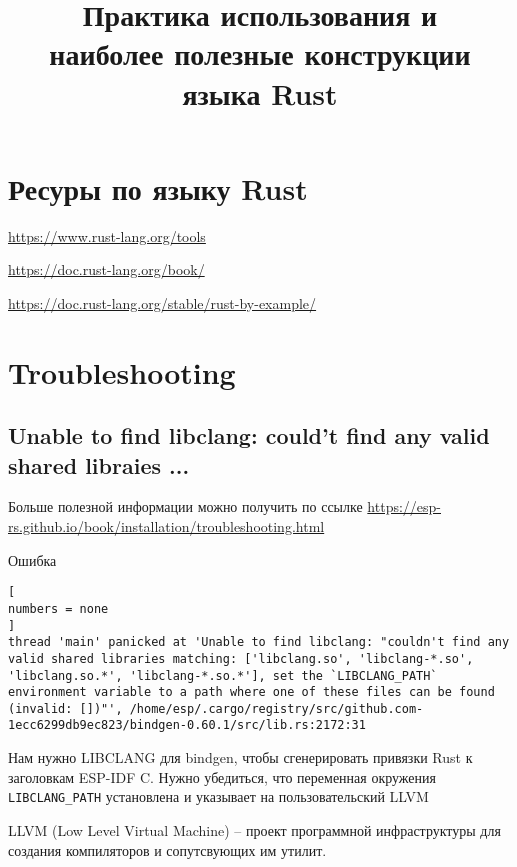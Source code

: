 \documentclass[%
	11pt,
	a4paper,
	utf8,
		]{article}
\begin{document}
\title{Практика использования и \\наиболее полезные конструкции языка Rust}

\author{}

\date{}
\maketitle

\thispagestyle{fancy}

\tableofcontents

\section{Ресуры по языку Rust}

\url{https://www.rust-lang.org/tools}

\url{https://doc.rust-lang.org/book/}

\url{https://doc.rust-lang.org/stable/rust-by-example/}

\section{Troubleshooting}

\subsection{Unable to find libclang: could't find any valid shared libraies ...}

Больше полезной информации можно получить по ссылке \url{https://esp-rs.github.io/book/installation/troubleshooting.html}

Ошибка
\begin{lstlisting}[
numbers = none	
]
thread 'main' panicked at 'Unable to find libclang: "couldn't find any valid shared libraries matching: ['libclang.so', 'libclang-*.so', 'libclang.so.*', 'libclang-*.so.*'], set the `LIBCLANG_PATH` environment variable to a path where one of these files can be found (invalid: [])"', /home/esp/.cargo/registry/src/github.com-1ecc6299db9ec823/bindgen-0.60.1/src/lib.rs:2172:31
\end{lstlisting}

Нам нужно LIBCLANG для bindgen, чтобы сгенерировать привязки Rust к заголовкам ESP-IDF C. Нужно убедиться, что переменная окружения \verb|LIBCLANG_PATH| установлена и указывает на пользовательский LLVM

LLVM (Low Level Virtual Machine) -- проект программной инфраструктуры для создания компиляторов и сопутсвующих им утилит. 
\end{document}
